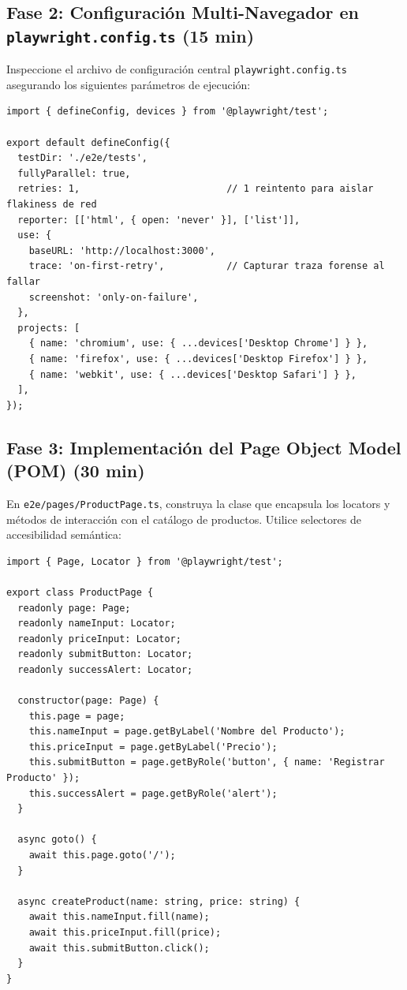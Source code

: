 \documentclass[10pt,letterpaper]{article}
\begin{document}
\subsection{Fase 2: Configuración Multi-Navegador en \texttt{playwright.config.ts} (15 min)}
Inspeccione el archivo de configuración central \texttt{playwright.config.ts} asegurando los siguientes parámetros de ejecución:
\begin{lstlisting}[style=codeStyle]
import { defineConfig, devices } from '@playwright/test';

export default defineConfig({
  testDir: './e2e/tests',
  fullyParallel: true,
  retries: 1,                          // 1 reintento para aislar flakiness de red
  reporter: [['html', { open: 'never' }], ['list']],
  use: {
    baseURL: 'http://localhost:3000',
    trace: 'on-first-retry',           // Capturar traza forense al fallar
    screenshot: 'only-on-failure',
  },
  projects: [
    { name: 'chromium', use: { ...devices['Desktop Chrome'] } },
    { name: 'firefox', use: { ...devices['Desktop Firefox'] } },
    { name: 'webkit', use: { ...devices['Desktop Safari'] } },
  ],
});
\end{lstlisting}

\subsection{Fase 3: Implementación del Page Object Model (POM) (30 min)}
En \texttt{e2e/pages/ProductPage.ts}, construya la clase que encapsula los locators y métodos de interacción con el catálogo de productos. Utilice selectores de accesibilidad semántica:
\begin{lstlisting}[style=codeStyle]
import { Page, Locator } from '@playwright/test';

export class ProductPage {
  readonly page: Page;
  readonly nameInput: Locator;
  readonly priceInput: Locator;
  readonly submitButton: Locator;
  readonly successAlert: Locator;

  constructor(page: Page) {
    this.page = page;
    this.nameInput = page.getByLabel('Nombre del Producto');
    this.priceInput = page.getByLabel('Precio');
    this.submitButton = page.getByRole('button', { name: 'Registrar Producto' });
    this.successAlert = page.getByRole('alert');
  }

  async goto() {
    await this.page.goto('/');
  }

  async createProduct(name: string, price: string) {
    await this.nameInput.fill(name);
    await this.priceInput.fill(price);
    await this.submitButton.click();
  }
}
\end{lstlisting}
\end{document}
